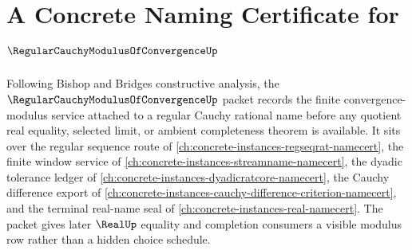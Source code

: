 \chapter{A Concrete Naming Certificate for $\RegularCauchyModulusOfConvergenceUp$}
\label{ch:concrete-instances-regular-cauchy-modulus-of-convergence-namecert}

Following Bishop and Bridges constructive analysis, the $\RegularCauchyModulusOfConvergenceUp$ packet records the finite convergence-modulus service attached to a regular Cauchy rational name before any quotient real equality, selected limit, or ambient completeness theorem is available. It sits over the regular sequence route of \autoref{ch:concrete-instances-regseqrat-namecert}, the finite window service of \autoref{ch:concrete-instances-streamname-namecert}, the dyadic tolerance ledger of \autoref{ch:concrete-instances-dyadicratcore-namecert}, the Cauchy difference export of \autoref{ch:concrete-instances-cauchy-difference-criterion-namecert}, and the terminal real-name seal of \autoref{ch:concrete-instances-real-namecert}. The packet gives later $\RealUp$ equality and completion consumers a visible modulus row rather than a hidden choice schedule.

